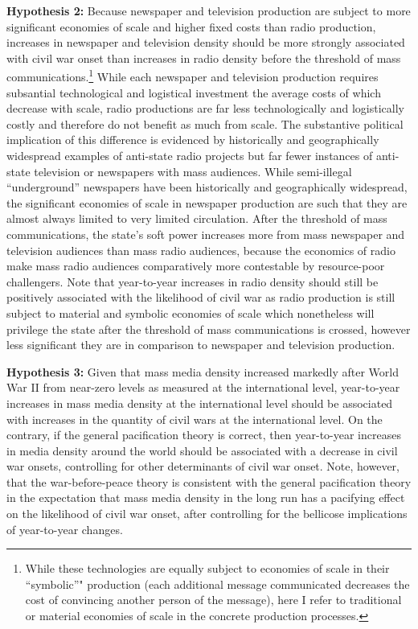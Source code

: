 \documentclass[11pt,article,oneside]{memoir}
\begin{document}
\textbf{Hypothesis 2:} Because newspaper and television production are
subject to more significant economies of scale and higher fixed costs
than radio production, increases in newspaper and television density
should be more strongly associated with civil war onset than increases
in radio density before the threshold of mass communications.\footnote{While
  these technologies are equally subject to economies of scale in their
  ``symbolic''" production (each additional message communicated
  decreases the cost of convincing another person of the message), here
  I refer to traditional or material economies of scale in the concrete
  production processes.} While each newspaper and television production
requires subsantial technological and logistical investment the average
costs of which decrease with scale, radio productions are far less
technologically and logistically costly and therefore do not benefit as
much from scale. The substantive political implication of this
difference is evidenced by historically and geographically widespread
examples of anti-state radio projects but far fewer instances of
anti-state television or newspapers with mass audiences. While
semi-illegal ``underground'' newspapers have been historically and
geographically widespread, the significant economies of scale in
newspaper production are such that they are almost always limited to
very limited circulation. After the threshold of mass communications,
the state's soft power increases more from mass newspaper and television
audiences than mass radio audiences, because the economics of radio make
mass radio audiences comparatively more contestable by resource-poor
challengers. Note that year-to-year increases in radio density should
still be positively associated with the likelihood of civil war as radio
production is still subject to material and symbolic economies of scale
which nonetheless will privilege the state after the threshold of mass
communications is crossed, however less significant they are in
comparison to newspaper and television production.

\textbf{Hypothesis 3:} Given that mass media density increased markedly
after World War II from near-zero levels as measured at the
international level, year-to-year increases in mass media density at the
international level should be associated with increases in the quantity
of civil wars at the international level. On the contrary, if the
general pacification theory is correct, then year-to-year increases in
media density around the world should be associated with a decrease in
civil war onsets, controlling for other determinants of civil war onset.
Note, however, that the war-before-peace theory is consistent with the
general pacification theory in the expectation that mass media density
in the long run has a pacifying effect on the likelihood of civil war
onset, after controlling for the bellicose implications of year-to-year
changes.
\end{document}
